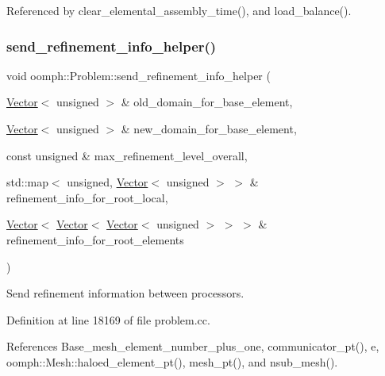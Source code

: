 Referenced by clear\+\_\+elemental\+\_\+assembly\+\_\+time(), and load\+\_\+balance().

\mbox{\label{classoomph_1_1Problem_a90e714411f1575e0e39cf0d497287b37}} 
\subsubsection{\texorpdfstring{send\+\_\+refinement\+\_\+info\+\_\+helper()}{send\_refinement\_info\_helper()}}
{\footnotesize\ttfamily void oomph\+::\+Problem\+::send\+\_\+refinement\+\_\+info\+\_\+helper (\begin{DoxyParamCaption}\item[{\hyperlink{classoomph_1_1Vector}{Vector}$<$ unsigned $>$ \&}]{old\+\_\+domain\+\_\+for\+\_\+base\+\_\+element,  }\item[{\hyperlink{classoomph_1_1Vector}{Vector}$<$ unsigned $>$ \&}]{new\+\_\+domain\+\_\+for\+\_\+base\+\_\+element,  }\item[{const unsigned \&}]{max\+\_\+refinement\+\_\+level\+\_\+overall,  }\item[{std\+::map$<$ unsigned, \hyperlink{classoomph_1_1Vector}{Vector}$<$ unsigned $>$ $>$ \&}]{refinement\+\_\+info\+\_\+for\+\_\+root\+\_\+local,  }\item[{\hyperlink{classoomph_1_1Vector}{Vector}$<$ \hyperlink{classoomph_1_1Vector}{Vector}$<$ \hyperlink{classoomph_1_1Vector}{Vector}$<$ unsigned $>$ $>$ $>$ \&}]{refinement\+\_\+info\+\_\+for\+\_\+root\+\_\+elements }\end{DoxyParamCaption})\hspace{0.3cm}{\ttfamily [private]}}



Send refinement information between processors. 



Definition at line 18169 of file problem.\+cc.



References Base\+\_\+mesh\+\_\+element\+\_\+number\+\_\+plus\+\_\+one, communicator\+\_\+pt(), e, oomph\+::\+Mesh\+::haloed\+\_\+element\+\_\+pt(), mesh\+\_\+pt(), and nsub\+\_\+mesh().



